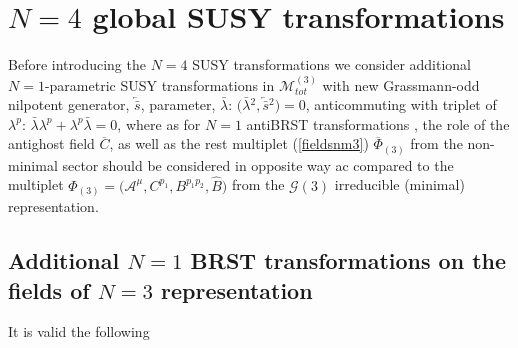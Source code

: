 \documentclass[10pt]{article}
\begin{document}
\section{$N=4$ global SUSY  transformations}\label{N4}

 \setcounter{equation}{0}

Before introducing the  $N=4$ SUSY  transformations we consider  additional $N=1$-parametric SUSY transformations in $\mathcal{M}^{(3)}_{tot}$ with new Grassmann-odd nilpotent generator, $\overleftarrow{\bar{s}}$,  parameter, $\bar{\lambda}$: $\big(\bar{\lambda}{}^2, \overleftarrow{\bar{s}}{}^2\big)=0$, anticommuting with triplet of $\lambda^p$: $\bar{\lambda}\lambda^p +\lambda^p\bar{\lambda}=0$, where as for $N=1$ antiBRST transformations \cite{aBRST1}, \cite{aBRST2}
the role of the antighost field $\overline{C}$, as well as the rest multiplet (\ref{fieldsnm3})
   $\overline{\Phi}{}_{(3)}$ from the non-minimal sector  should be considered in opposite way ac compared to the multiplet $\Phi_{(3)}=\big(\mathcal{A}^\mu, C^{p_1}, B^{p_1p_2}, \widehat{B}\big)$ from the $\mathcal{G}(3)$ irreducible (minimal) representation.

\subsection{Additional $N=1$ BRST  transformations on the fields of $N=3$ representation}\label{N31}

It is valid  the following
\end{document}
